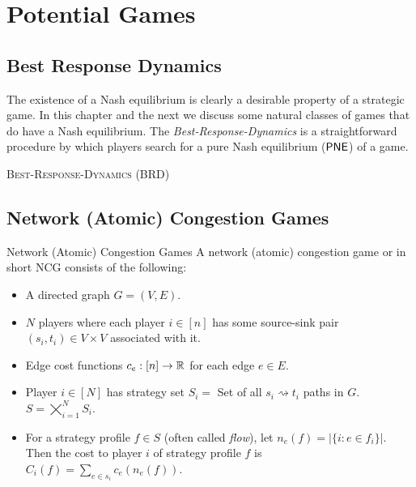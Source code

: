 \chapter{Potential Games}
\section{Best Response Dynamics}
The existence of a Nash equilibrium is clearly a desirable property of a strategic game. In this chapter and the next we discuss some natural classes of games that do have a Nash equilibrium. The \textit{Best-Response-Dynamics} is a straightforward procedure by which players search for a pure
Nash equilibrium ($\operatorname{\mathsf{PNE}}$) of a game. 

\begin{algorithm}\DontPrintSemicolon
{}
	
\caption{\textsc{Best-Response-Dynamics} (\textsf{BRD})}
\end{algorithm}



\section{Network (Atomic) Congestion Games}
\begin{Definition}{Network (Atomic) Congestion Games}{}
	A network (atomic) congestion game or in short NCG consists of the following:
	\begin{itemize}[itemsep=-1mm]
		\item A directed graph $G=(V,E)$.
		\item $N$ players where  each player $i\in[n]$ has some source-sink pair $(s_i,t_i)\in V\times V$ associated with it.
		\item Edge cost functions $c_e:[n]\to \mathbb{R}$ for each edge $e\in E$.
		\item Player $i\in[N]$ has strategy set $S_i=$ Set of all $s_i\rightsquigarrow t_i$ paths in $G$. $S=\bigtimes\limits_{i=1}^N S_i$.
		\item For a strategy profile $f\in S$ (often called \textit{flow}), let $n_e(f)=|\{i\colon e\in f_i\}|$. Then the cost to player $i$ of strategy profile $f$ is $C_i(f)=\sum\limits_{e\in s_i}c_e(n_e(f))$. 
	\end{itemize}
\end{Definition}

